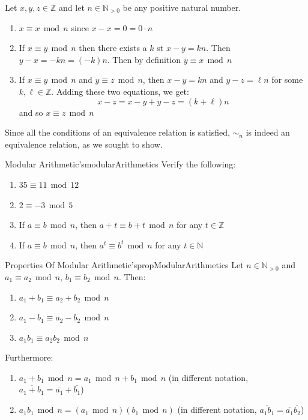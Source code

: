 \documentclass{book}
\newcommand{\N}{{\mathbb{N}}}
\newcommand{\Z}{{\mathbb{Z}}}
\newcommand{\oln}[1]{{\overline{#1}}}
\renewcommand{\mod}{\,\operatorname{mod}\,}
\begin{document}
\begin{Proof}
	Let $x,y,z \in \Z$ and let $n \in \N_{>0}$ be any positive natural number.
	\begin{enumerate}
		\item $x \equiv x \mod n$ since $x-x = 0 = 0\cdot n$
		\item If $x\equiv y\mod n$ then there exists a $k$ st $x-y = kn$. Then $y-x = -kn = (-k)n$. Then by
			definition $y\equiv x \mod n$
		\item If $x\equiv y \mod n$ and $y\equiv z \mod n$, then $x-y = kn$ and $y-z = \ell n$ for some
			$k,\ell \in \Z$. Adding these two equations, we get:
			\[
				x-z = x-y+y-z = (k+\ell)n
			\]
			and so $x\equiv z \mod n$
	\end{enumerate}
	Since all the conditions of an equivalence relation is satisfied, $\sim_n$ is indeed an equivalence
	relation, as we sought to show.
\end{Proof}

\begin{example}{Modular Arithmetic's}{modularArithmetics}
	Verify the following:
	\begin{enumerate}
		\item $35 \equiv 11 \mod 12$
		\item $2\equiv -3 \mod 5$
		\item If $a\equiv b\mod n$, then $a+t \equiv b+t \mod n$ for any $t \in \Z$
		\item If $a\equiv b\mod n$, then $a^t \equiv b^t \mod n$ for any $t \in \N$
	\end{enumerate}
\end{example}

\begin{prop}{Properties Of Modular Arithmetic's}{propModularArithmetics}
	Let $n \in \N_{>0}$ and $a_1\equiv a_2 \mod n$, $b_1\equiv b_2\mod n$. Then:
	\begin{enumerate}
		\item $a_1+b_1\equiv a_2+b_2\mod n$
		\item $a_1-b_1\equiv a_2-b_2\mod n$
		\item $a_1b_1 \equiv a_2b_2\mod n$
	\end{enumerate}
	Furthermore:
	\begin{enumerate}
		\item $a_1+b_1\mod n = a_1\mod n + b_1\mod n$ (in different notation, $\oln{a_1+b_1} = \oln{a_1}
			+ \oln{b_1}$)
		\item $a_1b_1\mod n = (a_1\mod n)(b_1\mod n)$ (in different notation, $\oln{a_1b_1}
			= \oln{a_1}\oln{b_2}$)
	\end{enumerate}
\end{prop}
\end{document}
